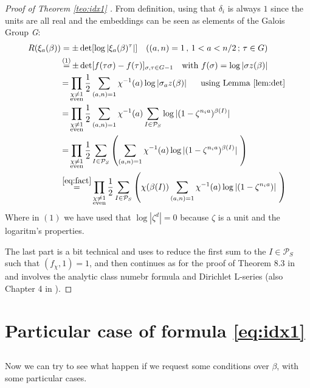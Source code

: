 \documentclass[]{article}
\theoremstyle{plain}
\theoremstyle{remark}
\theoremstyle{definition}
\newcommand{\PS}{\mathcal{P}_S}
\DeclareMathOperator*{\eqb }{=}
\begin{document}
\begin{proof}[Proof of Theorem \ref{teo:idx1} ]
			From definition, using that $ \delta_i $ is always $ 1 $ since the units are all real and the embeddings can be seen as elements of the Galois Group \textit{G}:
			\begin{align*}
				R(\xi_a(\beta))  & = \pm \det [\log |  \xi_a(\beta)^{\tau}|]											\quad ((a,n)=1 \, , \,1 < a <n/2 \, ; \, \tau \in G) \\
										& \eqb^{(1)} \pm \det [ f(\tau \sigma ) - f(\tau ) ]_{\sigma , \tau \in G - 1} 		\quad \text{with } f(\sigma)= \log |\sigma z(\beta)|\\
										& \eqb \prod_{\substack{\chi \neq 1 \\ \text{even}}}  \frac{1}{2} \sum_{ ( a , n)= 1} \chi^{-1}(a ) \log |\sigma_a z(\beta)|\ \quad \text{ using Lemma \ref{lem:det} }\\
										& \eqb \prod_{\substack{\chi \neq 1 \\ \text{even}}}  \frac{1}{2} \sum_{ ( a , n)= 1} \chi^{-1}(a ) \sum_{I \in \PS} \log | ( 1 - \zeta ^{n_i a} )^{\beta (I)}|\ \\
										& \eqb \prod_{\substack{\chi \neq 1 \\ \text{even}}}  \frac{1}{2}\sum_{I \in \PS} \left( \sum_{ ( a , n)= 1} \chi^{-1}(a )  \log | ( 1 - \zeta ^{n_i a} )^{\beta (I)}|\ \right) \\
										& \eqb^{\ref{eq:fact}} \prod_{\substack{\chi \neq 1 \\ \text{even}}}  \frac{1}{2}\sum_{I \in \PS} \left( \chi(\beta (I))\sum_{ ( a , n)= 1} \chi^{-1}(a )  \log | ( 1 - \zeta ^{n_i a} )|\ \right) 
			\end{align*}
			Where in $ (1) $ we have used that $ \log | \zeta ^ d| =0 $ because $\zeta$ is a unit and the logaritm's properties. 
			
			The last part is a bit technical and uses \cite[Lemma~8.4]{CF} to reduce the first sum to the $ I \in \PS $ such that $ (f_\chi , 1) = 1$, and then continues as for the proof of Theorem 8.3 in \cite[Pages~148-150]{CF} and involves the analytic class numebr formula %
			and Dirichlet L-series (also Chapter 4 in \cite{CF}). 
			\end{proof}
		
\section{Particular case of formula \ref{eq:idx1}}
	\subsection*{}
	Now we can try to see what happen if we request some conditions over $\beta$, with some particular cases.
	
\end{document}
